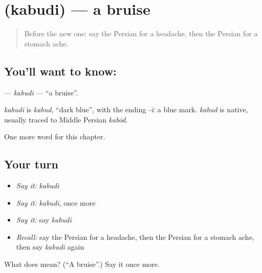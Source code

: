 \section[\texorpdfstring{\fa{کبودی} (kabudi)}{کبودی (kabudi)}]{ (kabudi) — a bruise}

\label{lesson:FA-C263-kabudi}



\begin{quote}
Before the new one: say the Persian for a headache, then the Persian for a stomach ache.
\end{quote}

\subsection*{You'll want to know: }
\textbf{} — \emph{kabudi} — \textquotedblleft{}a bruise\textquotedblright{}.

\begin{cousinweb}
\emph{kabudi} is \emph{kabud}, \textquotedblleft{}dark blue\textquotedblright{}, with the ending \emph{-i}: a blue mark. \emph{kabud} is native, usually traced to Middle Persian \emph{kabōd}.
\end{cousinweb}

\begin{grammarlens}[title={What you've built}]
One more word for this chapter.
\end{grammarlens}

\subsection*{Your turn}
\begin{itemize}
\raggedright
  \item \emph{Say it:} \emph{kabudi}
  \item \emph{Say it:} \emph{kabudi}, once more
  \item \emph{Say it:} say \emph{kabudi}
  \item \emph{Recall:} say the Persian for a headache, then the Persian for a stomach ache, then say \emph{kabudi} again
\end{itemize}

\begin{tcolorbox}[breakable,colback=teal!4,colframe=teal!35!black,title={Before you move on}]
What does  mean? (\textquotedblleft{}A bruise\textquotedblright{}.) Say it once more.
\end{tcolorbox}
